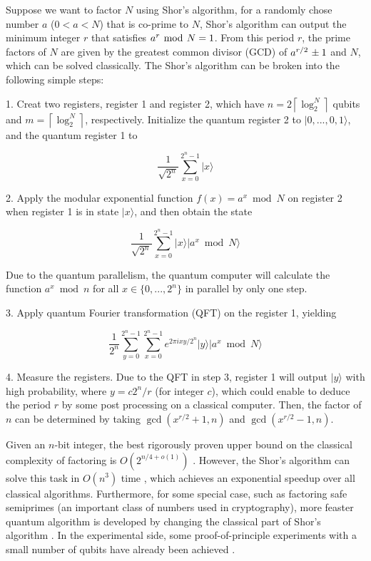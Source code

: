 \documentclass[aps,pra,twocolumn,superscriptaddress]{revtex4-1}
\begin{document}
Suppose we want to factor $N$ using Shor's algorithm, for a randomly chose number ${a}$ ($0<a<N$) that is co-prime to $N$, Shor's algorithm can output the minimum integer $r$ that satisfies ${{a^r}{\kern 1pt} \bmod {\kern 1pt} N = 1}$.  From this period $r$, the prime factors of $N$ are given by the greatest common divisor (GCD) of ${{a^{r/2}}{\kern 1pt}  \pm 1}$ and ${N}$, which can be solved classically. The Shor's algorithm can be broken into the following simple steps:

1. Creat two registers, register 1 and register 2, which have  $n=2\left\lceil {\log _2^N} \right\rceil$ qubits and $m=\left\lceil {\log _2^N} \right\rceil$, respectively. Initialize the quantum register 2 to $|0,...,0,1\rangle$, and the quantum register 1 to

\[\frac{1}{{\sqrt {{2^n}} }}\sum\limits_{x = 0}^{{2^n} - 1} {|x\rangle }\]


2. Apply the modular exponential function $f(x) = {a^x}\bmod N$ on register 2 when register 1 is in state $|x\rangle$, and then obtain the state

\[\frac{1}{{\sqrt {{2^n}} }}\sum\limits_{x = 0}^{{2^n} - 1} {|x\rangle|{a^x}\bmod N\rangle }\]

Due to the quantum parallelism, the quantum computer will calculate the function $a^{x} \bmod n$ for all $x \in \{ 0,...,{2^n}\}$ in parallel by only one step.

3. Apply quantum Fourier transformation (QFT) on the register 1, yielding

\[\frac{1}{{{2^n}}}\sum\limits_{y = 0}^{{2^n} - 1} {\sum\limits_{x = 0}^{{2^n} - 1} {{e^{2\pi ixy/{2^n}}}|y\rangle |{a^x}\bmod N\rangle } } \]

4. Measure the registers. Due to the QFT in step 3, register 1 will output $|y\rangle$ with high probability, where $y = c{2^n}/r$ (for integer $c$), which could enable to deduce the period $r$ by some post processing on a classical computer. Then, the factor of $n$ can be determined by taking $\gcd(x^{r/2} + 1, n)$ and  $\gcd(x^{r/2} - 1, n)$.

Given an $n$-bit integer, the best rigorously proven upper bound on the classical complexity of factoring is $O({2^{n/4 + o(1)}})$ \cite{pollard1974theorems, strassen1976einige}. However, the Shor's algorithm can solve this task in $O({n^3})$ time \cite{shor1997polynomial,shor1994algorithms}, which achieves an exponential speedup over all classical algorithms.  Furthermore, for some special case, such as factoring safe semiprimes (an important class of numbers used in cryptography), more feaster quantum algorithm is developed by changing the classical part of Shor's algorithm \cite{grosshans2015factoring}. In the experimental side, some proof-of-principle experiments with a small number of qubits have already been achieved \cite{monz2016realization, lucero2012computing, martin2012experimental, politi2009shor, lu2007demonstration, lanyon2007experimental, vandersypen2001experimental, johansson2017realization, huang2017experimental}.
\end{document}
